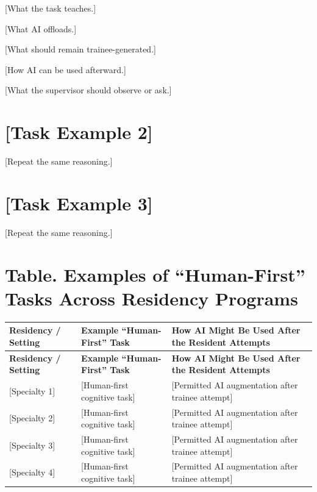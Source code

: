 \documentclass[12pt]{article}
\begin{document}
 [What the task teaches.]

 [What AI offloads.]

 [What should remain trainee-generated.]

 [How AI can be used afterward.]

 [What the supervisor should observe or ask.]

\section*{[Task Example 2]}

 [Repeat the same reasoning.]

\section*{[Task Example 3]}

 [Repeat the same reasoning.]


\section*{Table. Examples of ``Human-First'' Tasks Across Residency Programs}

\begin{longtable}{p{} p{} p{}}
	\toprule
	\textbf{Residency / Setting}
	 &
	\textbf{Example ``Human-First'' Task}
	 &
	\textbf{How AI Might Be Used After the Resident Attempts}
	\\
	\midrule
	\endfirsthead

	\toprule
	\textbf{Residency / Setting}
	 &
	\textbf{Example ``Human-First'' Task}
	 &
	\textbf{How AI Might Be Used After the Resident Attempts}
	\\
	\midrule
	\endhead

	[Specialty 1]
	 &
	[Human-first cognitive task]
	 &
	[Permitted AI augmentation after trainee attempt]
	\\

	[Specialty 2]
	 &
	[Human-first cognitive task]
	 &
	[Permitted AI augmentation after trainee attempt]
	\\

	[Specialty 3]
	 &
	[Human-first cognitive task]
	 &
	[Permitted AI augmentation after trainee attempt]
	\\

	[Specialty 4]
	 &
	[Human-first cognitive task]
	 &
	[Permitted AI augmentation after trainee attempt]
	\\

	\bottomrule
\end{longtable}
\end{document}
